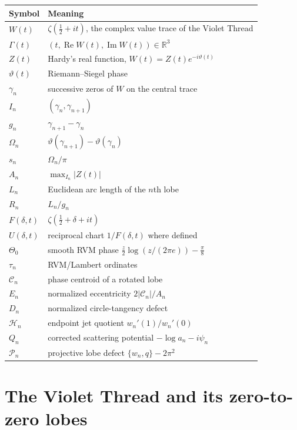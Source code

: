 \documentclass[11pt]{amsart}
\numberwithin{equation}{section}
\theoremstyle{definition}
\theoremstyle{remark}
\newcommand{\R}{\mathbb R}
\newcommand{\Ree}{\operatorname{Re}}
\newcommand{\Imm}{\operatorname{Im}}
\newcommand{\Hcal}{\mathcal H}
\newcommand{\Pcal}{\mathcal P}
\newcommand{\Ccal}{\mathcal C}
\begin{document}
\begin{center}
\small
\begin{tabular}{>{\raggedright\arraybackslash}p{}p{}}
\toprule
Symbol & Meaning \\
\midrule
$W(t)$ & $\zeta(\tfrac12+it)$, the complex value trace of the Violet Thread \\
$\Gamma(t)$ & $(t,\Ree W(t),\Imm W(t))\in\R^3$ \\
$Z(t)$ & Hardy's real function, $W(t)=Z(t)e^{-i\vartheta(t)}$ \\
$\vartheta(t)$ & Riemann--Siegel phase \\
$\gamma_n$ & successive zeros of $W$ on the central trace \\
$I_n$ & $(\gamma_n,\gamma_{n+1})$ \\
$g_n$ & $\gamma_{n+1}-\gamma_n$ \\
$\Omega_n$ & $\vartheta(\gamma_{n+1})-\vartheta(\gamma_n)$ \\
$s_n$ & $\Omega_n/\pi$ \\
$A_n$ & $\max_{I_n}|Z(t)|$ \\
$L_n$ & Euclidean arc length of the $n$th lobe \\
$R_n$ & $L_n/g_n$ \\
$F(\delta,t)$ & $\zeta(\tfrac12+\delta+it)$ \\
$U(\delta,t)$ & reciprocal chart $1/F(\delta,t)$ where defined \\
$\Theta_0$ & smooth RVM phase $\frac z2\log(z/(2\pi e))-\frac\pi8$ \\
$\tau_n$ & RVM/Lambert ordinates \\
$\Ccal_n$ & phase centroid of a rotated lobe \\
$E_n$ & normalized eccentricity $2|\Ccal_n|/A_n$ \\
$D_n$ & normalized circle-tangency defect \\
$\Hcal_n$ & endpoint jet quotient $w_n'(1)/w_n'(0)$ \\
$Q_n$ & corrected scattering potential $-\log a_n-i\psi_n$ \\
$\Pcal_n$ & projective lobe defect $\{w_n,q\}-2\pi^2$ \\
\bottomrule
\end{tabular}
\end{center}

\section{The Violet Thread and its zero-to-zero lobes}
\label{sec:thread}
\end{document}
